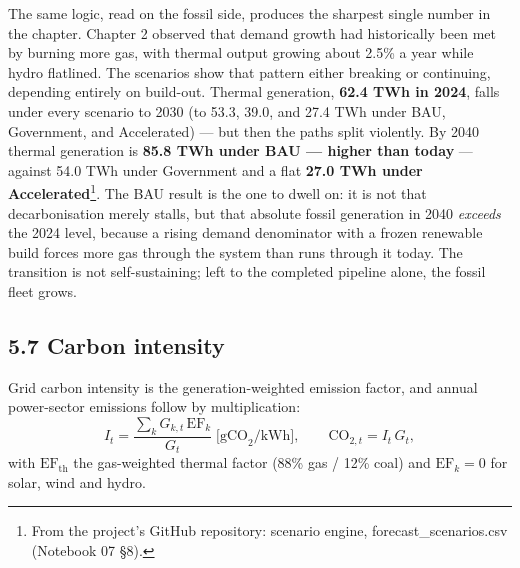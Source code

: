 \documentclass[10pt,twocolumn]{article}
\begin{document}
The same logic, read on the fossil side, produces the sharpest single number in the chapter. Chapter 2 observed that demand growth had historically been met by burning more gas, with thermal output growing about 2.5\% a year while hydro flatlined. The scenarios show that pattern either breaking or continuing, depending entirely on build-out. Thermal generation, \textbf{62.4 TWh in 2024}, falls under every scenario to 2030 (to 53.3, 39.0, and 27.4 TWh under BAU, Government, and Accelerated) --- but then the paths split violently. By 2040 thermal generation is \textbf{85.8 TWh under BAU --- higher than today} --- against 54.0 TWh under Government and a flat \textbf{27.0 TWh under Accelerated}\footnote{From the project's GitHub repository: scenario engine, forecast\_scenarios.csv (Notebook 07 \S{}8).}. The BAU result is the one to dwell on: it is not that decarbonisation merely stalls, but that absolute fossil generation in 2040 \textit{exceeds} the 2024 level, because a rising demand denominator with a frozen renewable build forces more gas through the system than runs through it today. The transition is not self-sustaining; left to the completed pipeline alone, the fossil fleet grows.

\subsection*{5.7 Carbon intensity}

\noindent Grid carbon intensity is the generation-weighted emission factor, and
annual power-sector emissions follow by multiplication:
\begin{equation}
I_t=\frac{\sum_k G_{k,t}\,\mathrm{EF}_k}{G_t}\;\bigl[\text{gCO}_2/\text{kWh}\bigr],
\qquad
\mathrm{CO}_{2,t}=I_t\,G_t,
\label{eq:carbon}
\end{equation}
with $\mathrm{EF}_{\mathrm{th}}$ the gas-weighted thermal factor
(88\% gas / 12\% coal) and $\mathrm{EF}_k=0$ for solar, wind and hydro.
\end{document}
